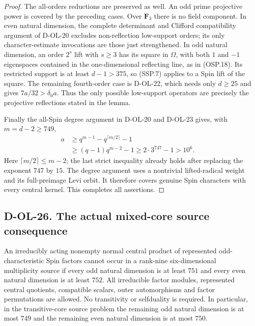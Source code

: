 \begin{proof}
The all-orders reductions are preserved as well.
An odd prime projective power is covered by the preceding
cases.  Over $\mathbf F_3$ there is no field component.
In even natural dimension, the complete determinant and
Clifford compatibility argument of D-OL-20 excludes
non-reflection low-support orders; its only character-estimate
invocations are those just strengthened.
In odd natural dimension, an order $2^s$ lift with $s\ge3$
has its square in $\Omega$, with both $1$ and $-1$
eigenspaces contained in the one-dimensional reflecting
line, as in (OSP.18).  Its restricted support is at least
$d-1>375$, so (SSP.7) applies to a Spin lift of the square.
The remaining fourth-order case is D-OL-22, which needs
only $d\ge25$ and gives $7a/32>\delta_0a$.
Thus the only possible low-support operators are precisely
the projective reflections stated in the lemma.

Finally the all-Spin degree argument in D-OL-20 and D-OL-23
gives, with $m=d-2\ge749$,
\[
 \begin{split}
 a&\ge q^{m-1}-q^{\lceil m/2\rceil}-1\\
  &\ge(q-1)q^{m-2}-1
   \ge2\cdot3^{747}-1>10^6.
 \end{split}                                                \tag{SSP.11}
\]
Here $\lceil m/2\rceil\le m-2$; the last strict inequality
already holds after replacing the exponent $747$ by $15$.
The degree argument uses a nontrivial lifted-radical weight
and its full-preimage Levi orbit.  It therefore covers genuine
Spin characters with every central kernel.
This completes all assertions.
\end{proof}

\subsection*{D-OL-26. The actual mixed-core source consequence}

\begin{theorem}[D-OL-26]
An irreducibly acting nonempty normal central product of
represented odd-characteristic Spin factors cannot occur in
a rank-nine six-dimensional multiplicity source if every odd
natural dimension is at least $751$ and every even natural
dimension is at least $752$.
All irreducible factor modules, represented central quotients,
compatible scalars, outer automorphisms and factor permutations
are allowed.  No transitivity or selfduality is required.
In particular, in the transitive-core source problem the
remaining odd natural dimension is at most $749$ and the
remaining even natural dimension is at most $750$.
\end{theorem}

